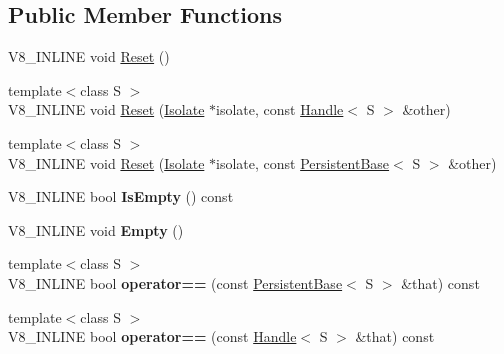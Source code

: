 \subsection*{Public Member Functions}
\begin{DoxyCompactItemize}
\item 
V8\+\_\+\+I\+N\+L\+I\+N\+E void \hyperlink{classv8_1_1_persistent_base_a174bb1e45b18fd4eeaee033622825bb8}{Reset} ()
\item 
{\footnotesize template$<$class S $>$ }\\V8\+\_\+\+I\+N\+L\+I\+N\+E void \hyperlink{classv8_1_1_persistent_base_a037c3a1b62263b2c2bb2096a6fba1c47}{Reset} (\hyperlink{classv8_1_1_isolate}{Isolate} $\ast$isolate, const \hyperlink{classv8_1_1_handle}{Handle}$<$ S $>$ \&other)
\item 
{\footnotesize template$<$class S $>$ }\\V8\+\_\+\+I\+N\+L\+I\+N\+E void \hyperlink{classv8_1_1_persistent_base_af6b8f929b0cbaa83341df48ca3b03ef5}{Reset} (\hyperlink{classv8_1_1_isolate}{Isolate} $\ast$isolate, const \hyperlink{classv8_1_1_persistent_base}{Persistent\+Base}$<$ S $>$ \&other)
\item 
\hypertarget{classv8_1_1_persistent_base_aa846b995b881b4863a21cf78ad7a8dea}{}V8\+\_\+\+I\+N\+L\+I\+N\+E bool {\bfseries Is\+Empty} () const \label{classv8_1_1_persistent_base_aa846b995b881b4863a21cf78ad7a8dea}

\item 
\hypertarget{classv8_1_1_persistent_base_abb8a06471ea86de1731a3c94a879b00e}{}V8\+\_\+\+I\+N\+L\+I\+N\+E void {\bfseries Empty} ()\label{classv8_1_1_persistent_base_abb8a06471ea86de1731a3c94a879b00e}

\item 
\hypertarget{classv8_1_1_persistent_base_a6374a132dba19abcdece47cb2080aca7}{}{\footnotesize template$<$class S $>$ }\\V8\+\_\+\+I\+N\+L\+I\+N\+E bool {\bfseries operator==} (const \hyperlink{classv8_1_1_persistent_base}{Persistent\+Base}$<$ S $>$ \&that) const \label{classv8_1_1_persistent_base_a6374a132dba19abcdece47cb2080aca7}

\item 
\hypertarget{classv8_1_1_persistent_base_addcfb82a71f7028207566de2904ead3c}{}{\footnotesize template$<$class S $>$ }\\V8\+\_\+\+I\+N\+L\+I\+N\+E bool {\bfseries operator==} (const \hyperlink{classv8_1_1_handle}{Handle}$<$ S $>$ \&that) const \label{classv8_1_1_persistent_base_addcfb82a71f7028207566de2904ead3c}


\end{DoxyCompactItemize}
